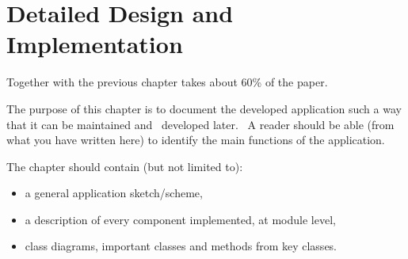 \chapter{Detailed Design and Implementation}
\label{ch:implementation}

Together with the previous chapter takes about 60\% of the paper.

The purpose of this chapter is to document the developed application such a way that it can be maintained and \
developed later. \
A reader should be able (from what you have written here) to identify the main functions of the application.

The chapter should contain (but not limited to):
\begin{itemize}
    \item a general application sketch/scheme,
    \item a description of every component implemented, at module level,
    \item class diagrams, important classes and methods from key classes.
\end{itemize}
